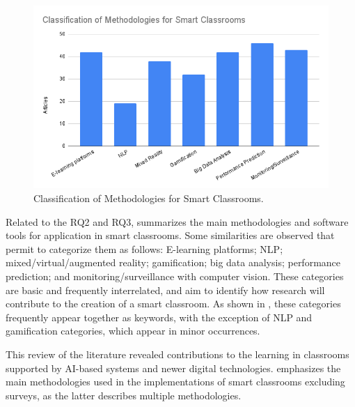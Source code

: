 \documentclass[english]{textolivre}
\begin{document}
\begin{figure}[htbp]
\centering
\begin{minipage}{.75\textwidth}
  \includegraphics[width=\textwidth]{figure03.png}
  \caption{Classification of Methodologies for Smart Classrooms.}
  \label{fig03}
\end{minipage}
\end{figure}


Related to the RQ2 and RQ3,  summarizes the main methodologies
and software tools for application in smart classrooms. Some
similarities are observed that permit to categorize them as follows:
E-learning platforms; NLP; mixed/virtual/augmented reality;
gamification; big data analysis; performance prediction; and
monitoring/surveillance with computer vision. These categories are basic
and frequently interrelated, and aim to identify how research will
contribute to the creation of a smart classroom. As shown in ,
these categories frequently appear together as keywords, with the
exception of NLP and gamification categories, which appear in minor
occurrences.

This review of the literature revealed contributions to the learning in
classrooms supported by AI-based systems and newer digital technologies.
 emphasizes the main methodologies used in the implementations of
smart classrooms excluding surveys, as the latter describes multiple
methodologies.
\end{document}
